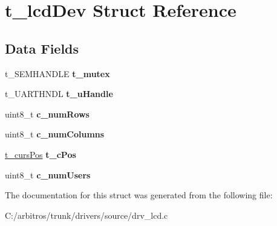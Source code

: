 \hypertarget{structt__lcd_dev}{\section{t\-\_\-lcd\-Dev Struct Reference}
\label{structt__lcd_dev}
}
\subsection*{Data Fields}
\begin{DoxyCompactItemize}
\item 
\hypertarget{structt__lcd_dev_ab0543e5662ae0b4ef5014d2c76ab248d}{t\-\_\-\-S\-E\-M\-H\-A\-N\-D\-L\-E {\bfseries t\-\_\-mutex}}\label{structt__lcd_dev_ab0543e5662ae0b4ef5014d2c76ab248d}

\item 
\hypertarget{structt__lcd_dev_adff9fcc9b301fd4d7521fb37d7490034}{t\-\_\-\-U\-A\-R\-T\-H\-N\-D\-L {\bfseries t\-\_\-u\-Handle}}\label{structt__lcd_dev_adff9fcc9b301fd4d7521fb37d7490034}

\item 
\hypertarget{structt__lcd_dev_ad47972fffe115973ae1942366a57aaa5}{uint8\-\_\-t {\bfseries c\-\_\-num\-Rows}}\label{structt__lcd_dev_ad47972fffe115973ae1942366a57aaa5}

\item 
\hypertarget{structt__lcd_dev_a86377dd2d5221b1948156b102aaf117c}{uint8\-\_\-t {\bfseries c\-\_\-num\-Columns}}\label{structt__lcd_dev_a86377dd2d5221b1948156b102aaf117c}

\item 
\hypertarget{structt__lcd_dev_a7ec70c91aa09ccca517c1c74ddfe4b76}{\hyperlink{structt__curs_pos}{t\-\_\-curs\-Pos} {\bfseries t\-\_\-c\-Pos}}\label{structt__lcd_dev_a7ec70c91aa09ccca517c1c74ddfe4b76}

\item 
\hypertarget{structt__lcd_dev_a65907c8d88006e5cdc5e6b18eb4606ba}{uint8\-\_\-t {\bfseries c\-\_\-num\-Users}}\label{structt__lcd_dev_a65907c8d88006e5cdc5e6b18eb4606ba}

\end{DoxyCompactItemize}


The documentation for this struct was generated from the following file\-:\begin{DoxyCompactItemize}
\item 
C\-:/arbitros/trunk/drivers/source/drv\-\_\-lcd.\-c\end{DoxyCompactItemize}
